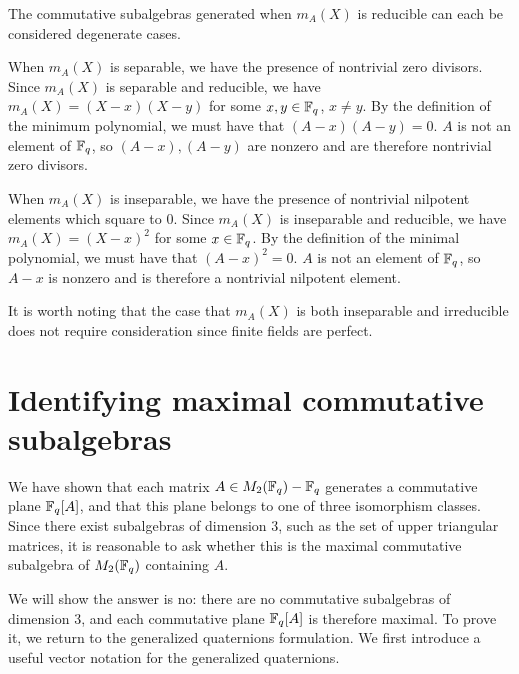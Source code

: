 \documentclass{amsart}
\begin{document}
    The commutative subalgebras generated when $m_A(X)$ is reducible can each be considered degenerate cases. 
    
    When $m_A(X)$ is separable, we have the presence of nontrivial zero divisors. Since $m_A(X)$ is separable and reducible, we have $m_A(X) = (X - x)(X - y)$ for some $x,y \in \protect\mathbb{F}_q$, $x \neq y$. By the definition of the minimum polynomial, we must have that $(A - x)(A - y) = 0$. $A$ is not an element of $\protect\mathbb{F}_q$, so $(A - x), (A - y)$ are nonzero and are therefore nontrivial zero divisors.
    
    When $m_A(X)$ is inseparable, we have the presence of nontrivial nilpotent elements which square to $0$. Since $m_A(X)$ is inseparable and reducible, we have $m_A(X) = (X - x)^2$ for some $x \in \protect\mathbb{F}_q$. By the definition of the minimal polynomial, we must have that $(A - x) ^ 2 = 0$. $A$ is not an element of $\protect\mathbb{F}_q$, so $A - x$ is nonzero and is therefore a nontrivial nilpotent element.
    
    It is worth noting that the case that $m_A(X)$ is both inseparable and irreducible does not require consideration since finite fields are perfect.

    
    

\section{Identifying maximal commutative subalgebras}

We have shown that each matrix $A \in M_2(\protect\mathbb{F}_q) - \protect\mathbb{F}_q$ generates a commutative plane $\protect\mathbb{F}_q[A]$, and that this plane belongs to one of three isomorphism classes.
Since there exist subalgebras of dimension 3, such as the set of upper triangular matrices, it is reasonable to ask whether this is the maximal commutative subalgebra of $M_2(\protect\mathbb{F}_q)$ containing $A$.

We will show the answer is no: there are no commutative subalgebras of dimension 3, and each commutative plane $\protect\mathbb{F}_q[A]$ is therefore maximal. To prove it, we return to the generalized quaternions formulation. We first introduce a useful vector notation for the generalized quaternions.
\end{document}

